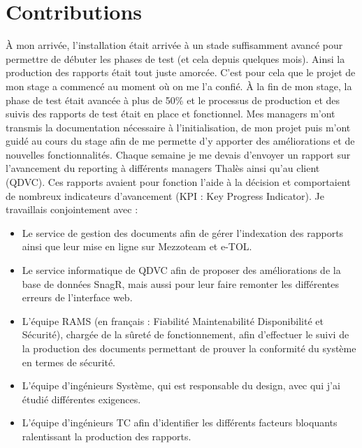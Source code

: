 \section{Contributions}
À mon arrivée, l'installation était arrivée à un stade suffisamment avancé pour permettre de débuter les phases de test (et cela depuis quelques mois).
Ainsi la production des rapports était tout juste amorcée.
C'est pour cela que le projet de mon stage a commencé au moment où on me l'a confié.
À la fin de mon stage, la phase de test était avancée à plus de 50\% et le processus de production et des suivis des rapports de test était en place et fonctionnel.
Mes managers m'ont transmis la documentation nécessaire à l'initialisation, de mon projet puis m'ont guidé au cours du stage afin de me permette d'y apporter des améliorations et de nouvelles fonctionnalités.
Chaque semaine je me devais d'envoyer un rapport sur l'avancement du \gls{reporting} à différents managers Thalès ainsi qu'au client (QDVC).
Ces rapports avaient pour fonction l'aide à la décision et comportaient de nombreux indicateurs d'avancement (\gls{KPI} : Key Progress Indicator).
Je travaillais conjointement avec :
\begin{itemize}
\item Le service de gestion des documents afin de gérer l'indexation des rapports ainsi que leur mise en ligne sur \gls{Mezzoteam} et \gls{e-TOL}.
\item Le service informatique de QDVC afin de proposer des améliorations de la base de données SnagR, mais aussi pour leur faire remonter les différentes erreurs de l'interface web.
\item L'équipe \gls{RAMS}  (en français : Fiabilité Maintenabilité Disponibilité et Sécurité), chargée de la sûreté de fonctionnement, afin d'effectuer le suivi de la production des documents permettant de prouver la conformité du système en termes de sécurité.
\item L'équipe d'ingénieurs Système, qui est responsable du design, avec qui j'ai étudié différentes exigences.
\item L'équipe d'ingénieurs \gls{TC} afin d'identifier les différents facteurs bloquants ralentissant la production des rapports.
\end{itemize}


